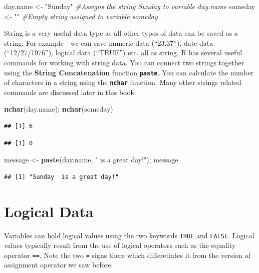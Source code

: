 \documentclass[]{krantz}
\makeatletter
\newenvironment{Shaded}{\begin{snugshade}}{\end{snugshade}}
\newcommand{\KeywordTok}[1]{\textcolor[rgb]{0.27,0.27,0.27}{\textbf{#1}}}
\newcommand{\StringTok}[1]{\textcolor[rgb]{0.5,0.5,0.5}{#1}}
\newcommand{\CommentTok}[1]{\textcolor[rgb]{0.37,0.37,0.37}{\textit{#1}}}
\newcommand{\NormalTok}[1]{#1}
\newenvironment{kframe}{%
\medskip{}
\setlength{\fboxsep}{.8em}
 \def\at@end@of@kframe{}%
 \ifinner\ifhmode%
  \def\at@end@of@kframe{\end{minipage}}%
  \begin{minipage}{\columnwidth}%
 \fi\fi%
 \def\FrameCommand##1{\hskip\@totalleftmargin \hskip-\fboxsep
 \colorbox{shadecolor}{##1}\hskip-\fboxsep
     \hskip-\linewidth \hskip-\@totalleftmargin \hskip\columnwidth}%
 \MakeFramed {\advance\hsize-\width
   \@totalleftmargin\z@ \linewidth\hsize
   \@setminipage}}%
 {\par\unskip\endMakeFramed%
 \at@end@of@kframe}
\renewenvironment{Shaded}{\begin{kframe}}{\end{kframe}}
\makeatother
\begin{document}
\begin{Shaded}
\begin{Highlighting}[]
\NormalTok{day.name <-}\StringTok{ "Sunday"} \CommentTok{#Assigns the string Sunday to variable day.name}
\NormalTok{someday <-}\StringTok{ ""} \CommentTok{#Empty string assigned to variable someday}
\end{Highlighting}
\end{Shaded}

String is a very useful data type as all other types of data can be
saved as a string. For example - we can save numeric data (``23.37''),
date data (``12/27/1976''), logical data (``TRUE'') etc. all as string.
R has several useful commands for working with string data. You can
connect two strings together using the \textbf{String Concatenation}
function \textbf{\texttt{paste}}. You can calculate the number of
characters in a string using the \textbf{\texttt{nchar}} function. Many
other strings related commands are discussed later in this book.

\begin{Shaded}
\begin{Highlighting}[]
\KeywordTok{nchar}\NormalTok{(day.name); }\KeywordTok{nchar}\NormalTok{(someday)}
\end{Highlighting}
\end{Shaded}

\begin{verbatim}
## [1] 6
\end{verbatim}

\begin{verbatim}
## [1] 0
\end{verbatim}

\begin{Shaded}
\begin{Highlighting}[]
\NormalTok{message <-}\StringTok{ }\KeywordTok{paste}\NormalTok{(day.name, }\StringTok{" is a great day!"}\NormalTok{); message}
\end{Highlighting}
\end{Shaded}

\begin{verbatim}
## [1] "Sunday  is a great day!"
\end{verbatim}

\section{Logical Data}\label{logical-data}

Variables can hold logical values using the two keywords \texttt{TRUE}
and \texttt{FALSE}. Logical values typically result from the use of
logical operators such as the equality operator \texttt{==}. Note the
two \texttt{=} signs there which differetiates it from the version of
assignment operator we saw before.
\end{document}

